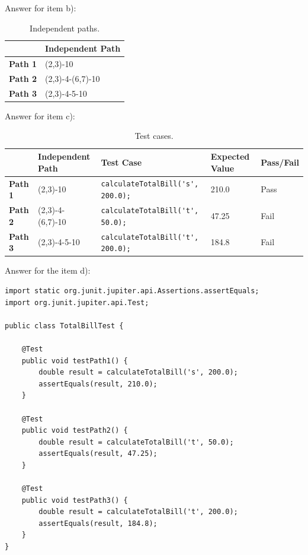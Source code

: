 \begin{exercise}
    Answer for item b):
    \begin{table}[H]
        \centering
        \renewcommand{\arraystretch}{1.2}
        \caption{Independent paths.}
        \label{tab:ex3-indep-paths}
        \begin{tabularx}{\textwidth}{lX}
            \toprule
             & Independent Path\\
            \midrule
            \textbf{Path 1} & (2,3)-10\\
            \textbf{Path 2} & (2,3)-4-(6,7)-10\\
            \textbf{Path 3} & (2,3)-4-5-10\\
            \bottomrule
        \end{tabularx}
    \end{table}
    
    Answer for item c):
    
    \begin{table}[H]
        \centering
        \renewcommand{\arraystretch}{1.2}
        \caption{Test cases.}
        \label{tab:ex3-test-cases}
        \begin{adjustbox}{max width=\textwidth}
            \begin{tabular}{lllll}
                \toprule
                 & Independent Path & Test Case & Expected Value & Pass/Fail\\
                \midrule
                \textbf{Path 1} & (2,3)-10 & \lstinline!calculateTotalBill('s', 200.0);! & 210.0 & Pass\\
                \textbf{Path 2} & (2,3)-4-(6,7)-10 & \lstinline!calculateTotalBill('t', 50.0);! & 47.25 & Fail\\
                \textbf{Path 3} & (2,3)-4-5-10 & \lstinline!calculateTotalBill('t', 200.0);! & 184.8 & Fail\\
                \bottomrule
            \end{tabular}
        \end{adjustbox}
    \end{table}
    
    Answer for the item d):
    \begin{lstlisting}[caption={A proposed answer for the item d).}]
import static org.junit.jupiter.api.Assertions.assertEquals;
import org.junit.jupiter.api.Test;

public class TotalBillTest {

    @Test
    public void testPath1() {
        double result = calculateTotalBill('s', 200.0);
        assertEquals(result, 210.0);
    }
    
    @Test
    public void testPath2() {
        double result = calculateTotalBill('t', 50.0);
        assertEquals(result, 47.25);
    }
    
    @Test
    public void testPath3() {
        double result = calculateTotalBill('t', 200.0);
        assertEquals(result, 184.8);
    }
}
    \end{lstlisting}

\end{exercise}

